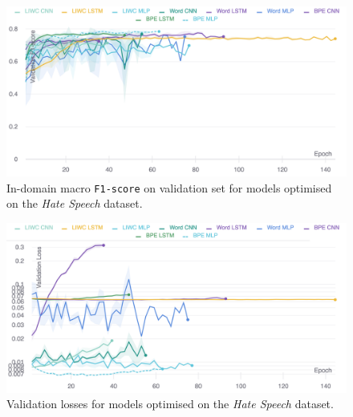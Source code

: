 \begin{figure}
    \centering
    \includegraphics[width=\textwidth]{waseem_hovy_dev_f1.pdf}
    \caption{In-domain macro \texttt{F1-score} on validation set for models optimised on the \textit{Hate Speech} dataset.}
    \label{fig:waseem_hovy_dev_f1}
\end{figure}
\begin{figure}
    \centering
    \includegraphics[width=\textwidth]{waseem_hovy_dev_loss_stderr_logscale.pdf}
    \caption{Validation losses for models optimised on the \textit{Hate Speech} dataset.}
    \label{fig:waseem_hovy_dev_loss}
\end{figure}

